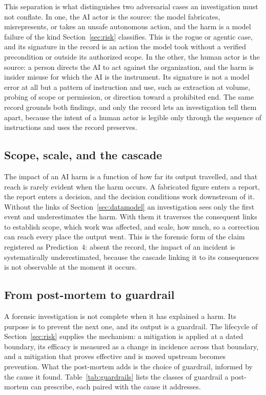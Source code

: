 \documentclass[11pt]{article}
\begin{document}
This separation is what distinguishes two adversarial cases an investigation must
not conflate. In one, the AI actor is the source: the model fabricates,
misrepresents, or takes an unsafe autonomous action, and the harm is a model
failure of the kind Section~\ref{sec:risk} classifies. This is the rogue or
agentic case, and its signature in the record is an action the model took without a
verified precondition or outside its authorized scope. In the other, the human
actor is the source: a person directs the AI to act against the organization, and
the harm is insider misuse for which the AI is the instrument. Its signature is not
a model error at all but a pattern of instruction and use, such as extraction at
volume, probing of scope or permission, or direction toward a prohibited end. The
same record grounds both findings, and only the record lets an investigation tell
them apart, because the intent of a human actor is legible only through the
sequence of instructions and uses the record preserves.

\subsection{Scope, scale, and the cascade}

The impact of an AI harm is a function of how far its output travelled, and that
reach is rarely evident when the harm occurs. A fabricated figure enters a report,
the report enters a decision, and the decision conditions work downstream of it.
Without the links of Section~\ref{sec:datamodel} an investigation sees only the
first event and underestimates the harm. With them it traverses the consequent
links to establish scope, which work was affected, and scale, how much, so a
correction can reach every place the output went. This is the forensic form of the
claim registered as Prediction~4: absent the record, the impact of an incident is
systematically underestimated, because the cascade linking it to its consequences
is not observable at the moment it occurs.

\subsection{From post-mortem to guardrail}

A forensic investigation is not complete when it has explained a harm. Its purpose
is to prevent the next one, and its output is a guardrail. The lifecycle of
Section~\ref{sec:risk} supplies the mechanism: a mitigation is applied at a dated
boundary, its efficacy is measured as a change in incidence across that boundary,
and a mitigation that proves effective and is moved upstream becomes prevention.
What the post-mortem adds is the choice of guardrail, informed by the cause it
found. Table~\ref{tab:guardrails} lists the classes of guardrail a post-mortem can
prescribe, each paired with the cause it addresses.
\end{document}
